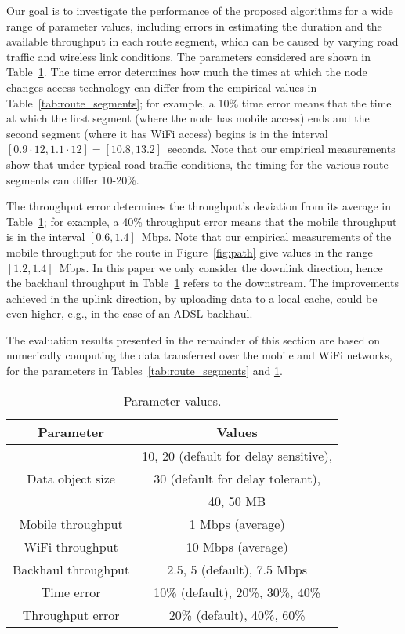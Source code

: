 \documentclass{sig-alternate}
\begin{document}
Our goal is to investigate the performance of the proposed algorithms for a wide range of parameter values, including  errors in estimating the duration and the available throughput in each route segment, which can be caused by varying road traffic and wireless link conditions. The parameters  considered  are shown in Table~\ref{tab:values}.
The time error determines how much the times at which the node changes access technology can differ from the empirical values  in  Table~\ref{tab:route_segments}; for example, a 10\% time error means that the time at which the first segment (where the node has mobile access) ends and the  second segment (where it has  WiFi access) begins is in the interval $[0.9 \cdot 12, 1.1 \cdot 12]=[10.8, 13.2]$~seconds. Note that our empirical measurements show that under typical road traffic conditions, the timing for the various route segments can differ 10-20\%.

The throughput error determines the throughput's deviation from its average    in Table~\ref{tab:values}; for example, a 40\% throughput error means that the mobile throughput is in the interval $[0.6,1.4]$~Mbps. Note that our empirical measurements of the mobile throughput for the route in Figure~\ref{fig:path} give values in the range $[1.2,1.4]$~Mbps.
In this paper we only consider the downlink direction, hence the backhaul throughput in Table~\ref{tab:values} refers to the downstream. The improvements achieved in the uplink direction, by uploading data to a local cache,  could be even higher, e.g., in the case of an ADSL backhaul.

The evaluation results presented in the remainder of this section are based on numerically computing the data transferred over the mobile and WiFi networks, for the parameters  in Tables~\ref{tab:route_segments} and \ref{tab:values}.



\begin{table}[tb]
\caption{Parameter values.}
    \label{tab:values}
\centering
 {\small \begin{tabular}{|c|c|}
        \hline
        Parameter  &  Values\\
        \hline \hline
         & 10, 20 (default for delay sensitive), \\
   Data object size      & 30 (default for delay tolerant), \\
         & 40, 50 MB \\
    Mobile throughput  & 1 Mbps (average)\\
    WiFi throughput & 10 Mbps (average)\\
    Backhaul throughput & 2.5, 5 (default), 7.5 Mbps \\
    Time error & 10\% (default), 20\%, 30\%, 40\%  \\
    Throughput error & 20\% (default), 40\%, 60\% \\
        \hline
        \end{tabular}
        }
\end{table}
\end{document}
